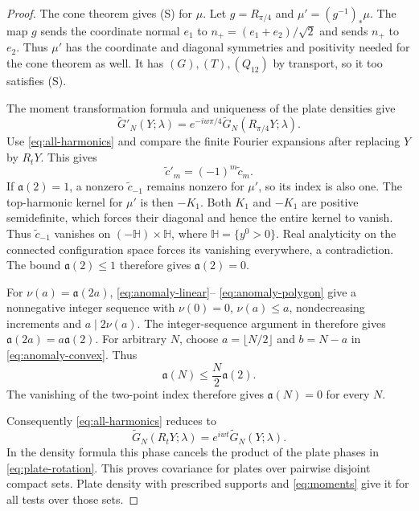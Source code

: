 \documentclass[11pt,letterpaper,reqno]{amsart}
\theoremstyle{definition}
\theoremstyle{remark}
\begin{document}
\begin{proof}
The cone theorem gives (S) for $\mu$. Let $g=R_{\pi/4}$ and
$\mu'=(g^{-1})_*\mu$. The map $g$ sends the coordinate normal $e_1$
to $n_+=(e_1+e_2)/\sqrt2$ and sends $n_+$ to $e_2$.
Thus $\mu'$ has the coordinate and diagonal symmetries and positivity
needed for the cone theorem as well. It has $(G),(T),(Q_{12})$ by
transport, so it too satisfies (S).

The moment transformation formula and uniqueness of the plate
densities give
\[
 \widetilde G'_N(Y;\lambda)
   =e^{-iw\pi/4}\widetilde G_N(R_{\pi/4}Y;\lambda).
\]
Use \eqref{eq:all-harmonics} and compare the finite Fourier expansions
after replacing $Y$ by $R_tY$. This gives
\begin{equation}\label{eq:sign-change}
 \widetilde c'_m=(-1)^m\widetilde c_m.
\end{equation}
If $\mathfrak a(2)=1$, a nonzero $\widetilde c_{-1}$ remains nonzero
for $\mu'$, so its index is also one. The top-harmonic kernel for
$\mu'$ is then $-K_1$. Both $K_1$ and $-K_1$ are positive
semidefinite, which forces their diagonal and hence the entire kernel
to vanish. Thus $\widetilde c_{-1}$ vanishes on
$(-\mathbb H)\times\mathbb H$, where $\mathbb H=\{y^0>0\}$.
Real analyticity on the connected configuration space forces its
vanishing everywhere, a contradiction. The bound
$\mathfrak a(2)\le1$ therefore gives $\mathfrak a(2)=0$.

For $\nu(a)=\mathfrak a(2a)$, \eqref{eq:anomaly-linear}--
\eqref{eq:anomaly-polygon} give a nonnegative integer sequence with
$\nu(0)=0$, $\nu(a)\le a$, nondecreasing increments and
$a\mid2\nu(a)$. The integer-sequence argument in
\cite[Section~8.9]{QEDCurrent} therefore gives
$\mathfrak a(2a)=a\mathfrak a(2)$.
For arbitrary $N$, choose $a=\lfloor N/2\rfloor$ and $b=N-a$
in \eqref{eq:anomaly-convex}. Thus
\begin{equation}\label{eq:reduction}
 \mathfrak a(N)\le\frac N2\mathfrak a(2).
\end{equation}
The vanishing of the two-point index therefore gives
$\mathfrak a(N)=0$ for every $N$.

Consequently \eqref{eq:all-harmonics} reduces to
\[
 \widetilde G_N(R_tY;\lambda)=e^{iwt}\widetilde G_N(Y;\lambda).
\]
In the density formula this phase cancels the product of the plate
phases in \eqref{eq:plate-rotation}. This proves covariance for plates
over pairwise disjoint compact sets. Plate density with prescribed
supports and \eqref{eq:moments} give it for all tests over those sets.
\end{proof}
\end{document}
